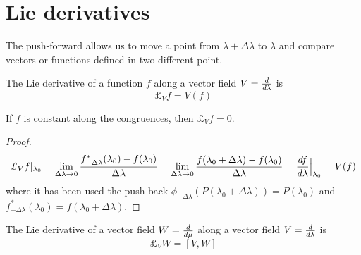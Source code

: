 \section{Lie derivatives}

    The push-forward allows us to move a point from $\lambda + \Delta \lambda$ to $\lambda$ and compare vectors or functions defined in two different point.

    \begin{definition}
        The Lie derivative of a function $f$ along a vector field $V=\frac{d}{d\lambda}$ is 
        \begin{equation} \label{liederf}
            \pounds_{V} f =  V(f)
        \end{equation}
        
    \end{definition} 
    If $f$ is constant along the congruences, then $\pounds_V f = 0$.

    \begin{proof}
        \begin{equation*}
            \pounds_{V} f \vert_{\lambda_0} = \lim_{\Delta \lambda \rightarrow 0} \frac{f^*_{-\Delta \lambda}(\lambda_0) - f(\lambda_0)}{\Delta \lambda} = \lim_{\Delta \lambda \rightarrow 0} \frac{f(\lambda_0 + \Delta \lambda)- f(\lambda_0)}{\Delta \lambda} = \dv{f}{\lambda} \Big \vert_{\lambda_0} = V(f)
        \end{equation*}
        where it has been used the push-back $\phi_{-\Delta\lambda} (P(\lambda_0 + \Delta \lambda)) = P(\lambda_0)$ and $f^*_{-\Delta\lambda} (\lambda_0) = f (\lambda_0 + \Delta \lambda)$.
    \end{proof}

    \begin{definition}
        The Lie derivative of a vector field $W=\frac{d}{d\mu}$ along a vector field $V=\frac{d}{d\lambda}$ is
        \begin{equation}\label{liederfv}
            \pounds_V W = [V, W]
        \end{equation}
    \end{definition}

